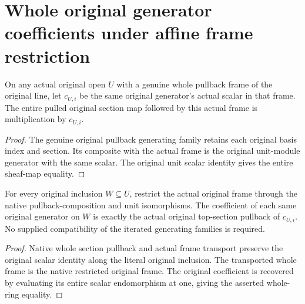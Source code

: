 \section{Whole original generator coefficients under affine frame restriction}

\begin{definition}
\label{def:fc-original-generator-local-frame-scalar}
\leanok
{}
On any actual original open $U$ with a genuine whole pullback frame
of the original line, let $c_{U,i}$ be the same original generator's
actual scalar in that frame. The entire pulled original section map
followed by this actual frame is multiplication by $c_{U,i}$.
\end{definition}
\begin{proof}
The genuine original pullback generating family retains each original
basis index and section. Its composite with the actual frame is the
original unit-module generator with the same scalar. The original
unit scalar identity gives the entire sheaf-map equality.
\end{proof}

\begin{theorem}
\label{thm:fc-original-generator-local-frame-restriction}
\leanok
{}
For every original inclusion $W\subseteq U$, restrict the actual
original frame through the native pullback-composition and unit
isomorphisms. The coefficient of each same original generator on
$W$ is exactly the actual original top-section pullback of $c_{U,i}$.
No supplied compatibility of the iterated generating families is
required.
\end{theorem}
\begin{proof}
Native whole section pullback and actual frame transport preserve the
original scalar identity along the literal original inclusion.
The transported whole frame is the native restricted original frame.
The original coefficient is recovered by evaluating its entire
scalar endomorphism at one, giving the asserted whole-ring equality.
\end{proof}
